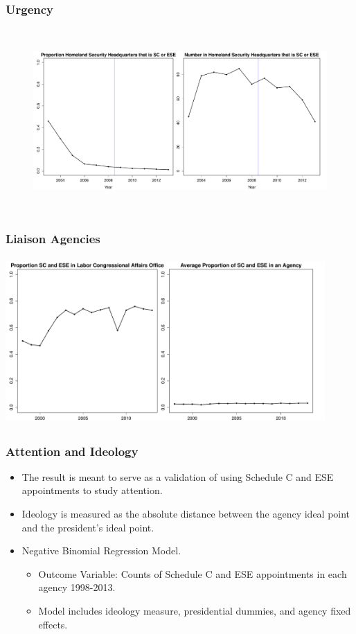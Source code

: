 \documentclass{beamer}
\begin{document}
\begin{frame}
\frametitle{Urgency}
\begin{figure}[htb]
\begin{center}
\includegraphics[height=2.75in,width=4.9in]{DHSProportionRawNumber.pdf}
\end{center}
\end{figure}
\end{frame}

\begin{frame}
\frametitle{Liaison Agencies}
\begin{center}
\includegraphics[height=2.5in,width=4.8in]{LaborCongressionalAffairs.pdf}
\end{center}
\end{frame}

\begin{frame}
\frametitle{Attention and Ideology}

\begin{itemize}\addtolength{\itemsep}{1.5\baselineskip}
\item The result is meant to serve as a validation of using Schedule C and ESE appointments to study attention. 
\item Ideology is measured as the absolute distance between the agency ideal point and the president's ideal point.
\item Negative Binomial Regression Model.
\begin{itemize}\addtolength{\itemsep}{1\baselineskip}
\item Outcome Variable: Counts of Schedule C and ESE appointments in each agency 1998-2013.
\item Model includes ideology measure, presidential dummies, and agency fixed effects.
\end{itemize}
\end{itemize}
\end{frame}
\end{document}
